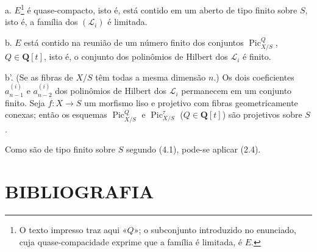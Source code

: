 \noindent a. $E$\footnote{O texto impresso traz aqui «$Q$»; o subconjunto
introduzido no enunciado, cuja quase-compacidade exprime que a família é
limitada, é $E$.} é quase-compacto, isto é, está contido em um aberto de tipo
finito sobre $S$, isto é, a família dos $(\mathcal L_i)$ é limitada.

\noindent b. $E$ está contido na reunião de um número finito dos conjuntos
$\operatorname{Pic}_{X/S}^Q$, $Q\in\mathbf Q[t]$, isto é, o conjunto dos
polinômios de Hilbert dos $\mathcal L_i$ é finito.

\noindent b'. (Se as fibras de $X/S$ têm todas a mesma dimensão $n$.) Os dois
coeficientes $a_{n-1}^{(i)}$ e $a_{n-2}^{(i)}$ dos polinômios de Hilbert dos
$\mathcal L_i$ permanecem em um conjunto finito.
 Seja $f:X\longrightarrow S$ um morfismo liso e
projetivo com fibras geometricamente conexas; então os esquemas
$\operatorname{Pic}_{X/S}^Q$ e $\operatorname{Pic}_{X/S}^\tau$
($Q\in\mathbf Q[t]$) são projetivos sobre $S$.

Como são de tipo finito sobre $S$ segundo (4.1), pode-se aplicar (2.4).

\section*{BIBLIOGRAFIA}

